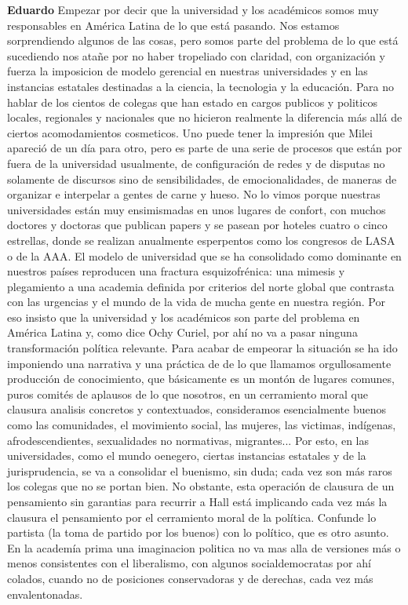 \documentclass[
  spanish,
  11pt,
  a4paper,
]{scrbook}
\newenvironment{transcripcion}{
    \begin{list}{}{
        \setlength{\leftmargin}{1.5em}  %
        \setlength{\rightmargin}{0em}
        \setlength{\itemsep}{0.2em}     %
        \setlength{\parsep}{0.0em}
        \setlength{\listparindent}{0pt}
    }
}{
    \end{list}
}
\newcommand{\personaje}[1]{\textbf{#1}\quad}
\begin{document}
\begin{transcripcion}
\item \personaje{Eduardo} Empezar por decir que la universidad y los académicos somos muy responsables en América Latina de lo que está pasando. Nos estamos sorprendiendo algunos de las cosas, pero somos parte del problema de lo que está sucediendo nos atañe por no haber tropeliado con claridad, con organización y fuerza la imposicion de modelo gerencial en nuestras universidades y en las instancias estatales destinadas a la ciencia, la tecnologia y la educación. Para no hablar de los cientos de colegas que han estado en cargos publicos y politicos locales, regionales y nacionales que no hicieron realmente la diferencia más allá de ciertos acomodamientos cosmeticos. Uno puede tener la impresión que Milei apareció de un día para otro, pero es parte de una serie de procesos que están por fuera de la universidad usualmente, de configuración de redes y de disputas no solamente de discursos sino de sensibilidades, de emocionalidades, de maneras de organizar e interpelar a gentes de carne y hueso. No lo vimos porque nuestras universidades están muy ensimismadas en unos lugares de confort, con muchos doctores y doctoras que publican papers y se pasean por hoteles cuatro o cinco estrellas, donde se realizan anualmente esperpentos como los congresos de LASA o de la AAA. El modelo de universidad que se ha consolidado como dominante en nuestros países reproducen una fractura esquizofrénica: una mimesis y plegamiento a una academia definida por criterios del norte global que contrasta con las urgencias y el mundo de la vida de mucha gente en nuestra región. Por eso insisto que la universidad y los académicos son parte del problema en América Latina y, como dice Ochy Curiel, por ahí no va a pasar ninguna transformación política relevante. Para acabar de empeorar la situación se ha ido imponiendo una narrativa y una práctica de de lo que llamamos orgullosamente producción de conocimiento, que básicamente es un montón de lugares comunes, puros comités de aplausos de lo que nosotros, en un cerramiento moral que clausura analisis concretos y contextuados, consideramos esencialmente buenos como las comunidades, el movimiento social, las mujeres, las victimas, indígenas, afrodescendientes, sexualidades no normativas, migrantes... Por esto, en las universidades, como el mundo oenegero, ciertas instancias estatales y de la jurisprudencia, se va a consolidar el buenismo, sin duda; cada vez son más raros los colegas que no se portan bien. No obstante, esta operación de clausura de un pensamiento sin garantias para recurrir a Hall está implicando cada vez más la clausura el pensamiento por el cerramiento moral de la política. Confunde lo partista (la toma de partido por los buenos) con lo político, que es otro asunto. En la academía prima una imaginacion politica no va mas alla de versiones más o menos consistentes con el liberalismo, con algunos socialdemocratas por ahí colados, cuando no de posiciones conservadoras y de derechas, cada vez más envalentonadas.


\end{transcripcion}
\end{document}
